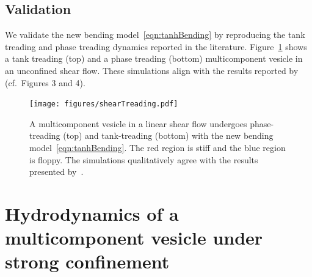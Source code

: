 \documentclass[twoside,twocolumn,9pt]{article}
\newcommand{\subfigimg}[3][,]{%
  \setbox1=\hbox{\texttt{[image: \#3]}}%
  \leavevmode\rlap{\usebox1}%
  \rlap{\hspace*{0pt}\raisebox{\dimexpr\ht1-0\baselineskip}{\bf
  \normalsize #2}}%
  \phantom{\usebox1}%
}
\begin{document}
\subsection{Validation}
\label{sec:validation}
We validate the new bending model~\eqref{eqn:tanhBending} by reproducing
the tank treading and phase treading dynamics reported in the
literature. Figure~\ref{fig:treading} shows a tank treading (top) and a
phase treading (bottom) multicomponent vesicle in an unconfined shear
flow. These simulations align with the results reported
by~\citet{liu-mar-li-vee-low2017} (cf.~Figures 3 and 4).
\begin{figure}[H]
  \centering
  \texttt{[image: figures/shearTreading.pdf]}
  \caption{\label{fig:treading} \small A multicomponent vesicle in a
  linear shear flow undergoes phase-treading (top) and tank-treading
  (bottom) with the new bending model~\eqref{eqn:tanhBending}. The red
  region is stiff and the blue region is floppy. The simulations
  qualitatively agree with the results presented
  by~\citet{liu-mar-li-vee-low2017}.}
\end{figure}



\section{\label{sec:results}Hydrodynamics of a multicomponent vesicle under strong confinement}
\end{document}
